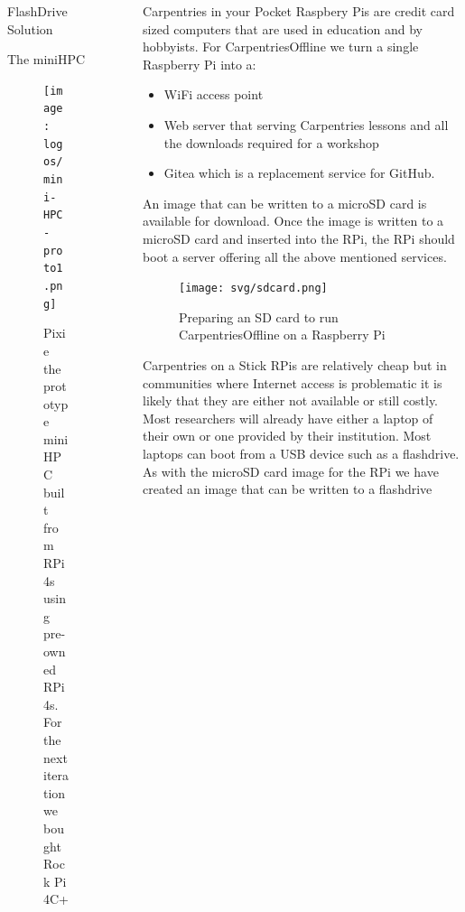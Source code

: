 \documentclass[final,20pt]{beamer}
\newlength{\sepwidth}
\newlength{\colwidth}
\newcommand{\separatorcolumn}{\begin{column}{\sepwidth}\end{column}}
\begin{document}
\begin{frame}[t]
\begin{columns}[t]
\begin{column}{\colwidth}
\begin{block}{FlashDrive Solution}
				\end{block}
				\begin{block}{The miniHPC }	
					\begin{figure}
						\begin{center}
							\texttt{[image: logos/mini-HPC-proto1.png]}
							\caption{Pixie the prototype miniHPC built from RPi4s using pre-owned RPi 4s. 
								For the next iteration we bought Rock Pi 4C+}
						\end{center}
					\end{figure}
				\end{block}
			\end{column}
			\separatorcolumn
			\begin{column}{\colwidth}
				\begin{alertblock}{Carpentries in your Pocket}
					Raspbery Pis are credit card sized computers that are used in education and by hobbyists.
					For CarpentriesOffline we turn a single Raspberry Pi into a:
					\begin{itemize}
					\item WiFi access point
					\item Web server that serving Carpentries lessons and all the downloads required for 
					a workshop
					\item Gitea which is a replacement service for GitHub. 
					\end{itemize}
					An image that can be written to a microSD card is available 
					for download. Once the image is written to a microSD card and inserted into the RPi, 
					the RPi should boot a server offering all the above mentioned services.
					\begin{center}
						\begin{figure}
							\texttt{[image: svg/sdcard.png]}
							\caption{Preparing an SD card to run CarpentriesOffline on a Raspberry Pi}
						\end{figure}
					\end{center}
				\end{alertblock}		
				\begin{alertblock}{Carpentries on a Stick}
					RPis are relatively cheap but in communities where Internet access is problematic it is likely that they are either not available or still 
					costly. Most researchers will already have either a laptop of their own or one provided by their institution. Most laptops can boot from 
					a USB device such as a flashdrive. As with the microSD card image for the RPi we have created an image that can be written to a flashdrive 

\end{alertblock}
\end{column}
\end{columns}
\end{frame}
\end{document}
